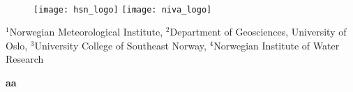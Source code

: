 \documentclass[12pt,a4paper,english]{article}
\begin{document}
\begin{figure}[!h]
	\begin{center}
   { }\\ \vspace{5mm}
   { \hspace{5mm} { \texttt{[image: hsn\_logo]} } \hspace{5mm} { \texttt{[image: niva\_logo]} } }
	\end{center}	
\end{figure}
\noindent$^1$Norwegian Meteorological Institute, $^2$Department of Geosciences, University of Oslo, $^3$University College of Southeast Norway, $^4$Norwegian Institute of Water Research

\newpage
\thispagestyle{empty}
\noindent \textbf{\color{white} aa} 
\thispagestyle{empty}  %

\setlength{\unitlength}{1mm}  %
\end{document}
